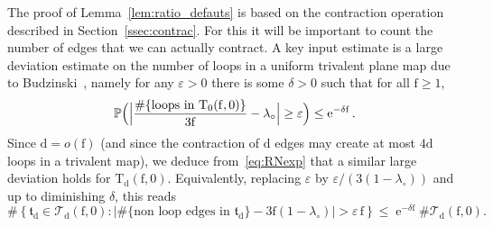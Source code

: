 \documentclass[11pt]{article}
\theoremstyle{plain}
\theoremstyle{definition}
\theoremstyle{remark}
\renewcommand{\P}{\mathbb{P}}
\newcommand{\e}{\operatorname{e}}
\newcommand{\Triv}{\mathrm{T}}
\newcommand{\face}{\mathrm{f}}
\newcommand{\defect}{\mathrm{d}}
\begin{document}
The proof of Lemma~\ref{lem:ratio_defauts} is based on the contraction operation described in Section~\ref{ssec:contrac}.
For this it will be important to count the number of edges that we can actually contract. A key input estimate is a large deviation estimate on the number of loops in a uniform trivalent plane map due to Budzinski~\cite[Th.\,2]{Bud21}, namely for any $ \varepsilon>0$ there is some $\delta>0$ such that for all $ \face \geq 1$,
\[
\P\Bigl(\Bigl| \frac{\#\{\text{loops in } \Triv_0(\face, 0)\}}{3 \face} - \lambda_{\circ}\Bigr| \geq \varepsilon \Bigr) \leq \e^{-\delta \face}.
\]
Since $ \defect=o(\face)$ (and since the contraction of $ \defect$ edges may create at most $4 \defect$ loops in a trivalent map), we deduce from~\eqref{eq:RNexp} that a similar large deviation holds for $\mathrm{T}_\defect(\face,0)$.
Equivalently, replacing $\varepsilon$ by $\varepsilon/(3(1-\lambda_{\circ}))$ and up to diminishing $ \delta$, this reads
\begin{equation}\label{eq:grande_dev_loops}
\#\left\{\mathfrak{t}_{\defect} \!\in\! \mathcal{T}_\defect(\face, 0) : \left|\#\{\text{non loop edges in } \mathfrak{t}_\defect\} - 3\face(1-\lambda_{\circ})\right| \!>\! \varepsilon\, \face \right\} \le \e^{-\delta \face}\! \# \mathcal{T}_\defect(\face, 0).
\end{equation}
\end{document}
